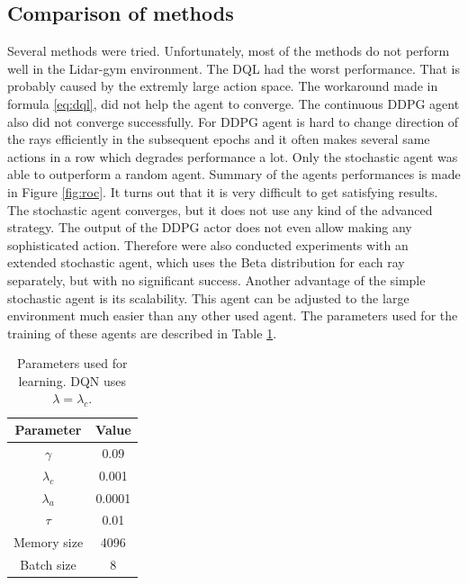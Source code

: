 \subsection{Comparison of methods}
Several methods were tried. Unfortunately, most of the methods do not perform well in the Lidar-gym environment. The DQL had the worst performance. That is probably caused by the extremly large action space. The workaround made in formula \eqref{eq:dql}, did not help the agent to converge. The continuous DDPG agent also did not converge successfully. For DDPG agent is hard to change direction of the rays efficiently in the subsequent epochs and it often makes several same actions in a row which degrades performance a lot. Only the stochastic agent was able to outperform a random agent. Summary of the agents performances is made in Figure \ref{fig:roc}. It turns out that it is very difficult to get satisfying results. The stochastic agent converges, but it does not use any kind of the advanced strategy. The output of the DDPG actor does not even allow making any sophisticated action. Therefore were also conducted experiments with an extended stochastic agent, which uses the Beta distribution for each ray separately, but with no significant success. Another advantage of the simple stochastic agent is its scalability. This agent can be adjusted to the large environment much easier than any other used agent. The parameters used for the training of these agents are described in Table \ref{tab:params}.

\clearpage

\begin{table}[h!]
  \centering
  \begin{tabular}{*{2}{c}}
    \toprule
    Parameter & Value \\
    \midrule
    $\gamma$ & 0.09 \\
    $\lambda_{c}$ & 0.001 \\
    $\lambda_{a}$ & 0.0001 \\
    $\tau$ & 0.01 \\
    Memory size & 4096 \\
    Batch size & 8 \\
    \bottomrule
  \end{tabular}
  \caption[Learning parameters]{Parameters used for learning. DQN uses $\lambda = \lambda_{c}$.}
  \label{tab:params}
\end{table}


